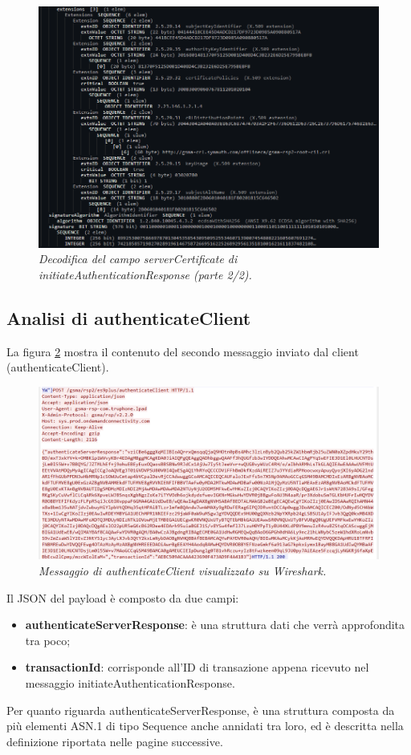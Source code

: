 \documentclass[10pt, oneside]{book}
\begin{document}
\begin{figure}
\includegraphics[width=\linewidth]{decode-serverCertificate2.png}
\caption{\textit{Decodifica del campo serverCertificate di initiateAuthenticationResponse (parte 2/2).}}
\label{fig:decode-serverCertificate2}
\end{figure}

\subsection{Analisi di authenticateClient}
La figura \ref{fig:msg3-stream-pcap} mostra il contenuto del secondo messaggio inviato dal client (authenticateClient).\\
\begin{figure}
\includegraphics[width=\linewidth]{msg3-stream-pcap.png}
\caption{\textit{Messaggio di authenticateClient visualizzato su Wireshark.}}
\label{fig:msg3-stream-pcap}
\end{figure}
Il JSON del payload è composto da due campi:
\begin{itemize}
\item \textbf{authenticateServerResponse}: è una struttura dati che verrà approfondita tra poco;
\item \textbf{transactionId}: corrisponde all'ID di transazione appena ricevuto nel messaggio initiateAuthenticationResponse.
\end{itemize}
Per quanto riguarda authenticateServerResponse, è una struttura composta da più elementi ASN.1 di tipo Sequence anche annidati tra loro, ed è descritta nella definizione riportata nelle pagine successive\cite{RSP-definitions}.\\
\end{document}
